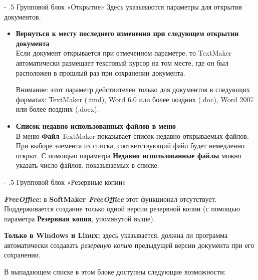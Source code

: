 ﻿\documentclass[a4paper,10pt]{article}
\makeatletter
\renewcommand\paragraph{%
   \@startsection{paragraph}{4}{0mm}%
      {-\baselineskip}%
      {.5\baselineskip}%
      {\normalfont\normalsize\bfseries}}
\makeatother
\begin{document}
 \paragraph{Групповой блок «Открытие»}
 Здесь указываются параметры для открытия документов.
 
 \begin{itemize}
  \item \textbf{Вернуться к месту последнего изменения при следующем открытии документа}\\
  Если документ открывается при отмеченном параметре, то TextMaker автоматически размещает текстовый курсор на том месте, где он был расположен в прошлый раз при сохранении документа.
  
  Внимание: этот параметр действителен только для документов в следующих форматах: TextMaker (.tmd), Word 6.0 или более поздних (.doc), Word 2007 или более поздних (.docx).
  
  \item \textbf{Список недавно использованных файлов в меню}\\
  В меню \textbf{Файл} TextMaker показывает список недавно открываемых файлов. При выборе элемента из списка, соответствующий файл будет немедленно открыт. С помощью параметра \textbf{Недавно использованные файлы} можно указать число файлов, показываемых в списке.
 \end{itemize}

 \paragraph{Групповой блок «Резервные копии»}
 \begin{mdframed}[backgroundcolor=pink!50]
\textbf{\textit{FreeOffice}:} в \textbf{SoftMaker \textit{FreeOffice}} этот функционал отсутствует. Поддерживается создание только одной версии резервной копии (с помощью параметра \textbf{Резервная копия}, упомянутой выше).
\end{mdframed}

\textbf{Только в Windows и Linux:} здесь указывается, должна ли программа автоматически создавать \textit{резервную копию} предыдущей версии документа при его сохранении.

 В выпадающем списке в этом блоке доступны следующие возможности:
 
\end{document}
